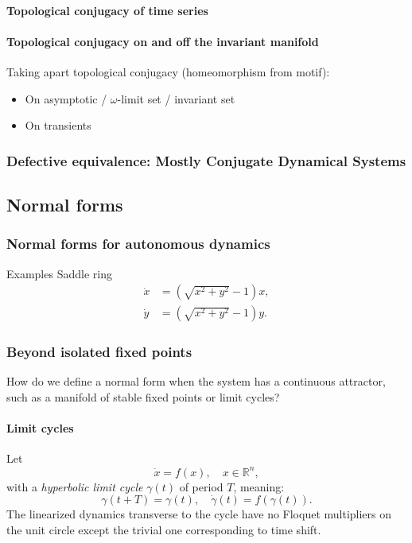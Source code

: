 \documentclass{article}
\theoremstyle{definition} \newtheorem{definition}{Definition}  \newtheorem{example}{Example}
\theoremstyle{remark} \newtheorem{remark}{Remark}
\newcounter{ct}
\begin{document}
\paragraph{Topological conjugacy of time series}
\citep{dlotko2024topconj}


\paragraph{Topological conjugacy on and off the invariant manifold}
Taking apart topological conjugacy (homeomorphism from motif):
\begin{itemize}
\item On asymptotic / $\omega$-limit set / invariant set
\item On transients \citep{koch2024biological}
\end{itemize}


\subsubsection{Defective equivalence: Mostly Conjugate Dynamical Systems}
\citep{skufca2007relaxing, skufca2008mostlyconjugate, bollt2010comparing}



\subsection{Normal forms}

\subsubsection{Normal forms for autonomous dynamics}%
Examples
Saddle ring
\begin{equation}
\begin{aligned}
\dot{x} &= (\sqrt{x^2 + y^2} - 1) x, \\
\dot{y} &= (\sqrt{x^2 + y^2} - 1) y.
\end{aligned}
\end{equation}


\subsubsection{Beyond isolated fixed points}
How do we define a normal form when the system has a continuous attractor, such as a manifold of stable fixed points or limit cycles?
\paragraph{Limit cycles}%
Let 
\[
\dot{x} = f(x), \quad x \in \mathbb{R}^n,
\]
with a \emph{hyperbolic limit cycle} \( \gamma(t) \) of period \( T \), meaning:
\[
\gamma(t + T) = \gamma(t), \quad \dot{\gamma}(t) = f(\gamma(t)).
\]
The linearized dynamics transverse to the cycle have no Floquet multipliers on the unit circle except the trivial one corresponding to time shift.
\end{document}
